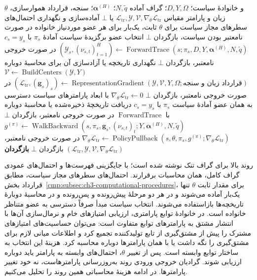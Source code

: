\begin{algorithm}[!htbp]
\caption{روند $\operatorname{FullBatchGradient}$: محاسبهٔ گرادیان تمام‌دسته‌ای}
\label{cmp:alg:ch3-gradient-full-batch}
\begin{algorithmic}[1]
\REQUIRE $\theta$ و خانوادهٔ سیاست؛ $D,Y,\Omega$؛
گراف آماده $N,\widetilde q$؛ $\boldsymbol\alpha^{(H)}$؛
سنجه، قرارداد هموارسازی، زیان و پارامتر مقیاس
\ENSURE $\mathcal L_{\mathrm{tr}},\mathscr Y,\mathcal V,
\nabla_\theta\mathcal L_{\mathrm{tr}}$ یا $\bot$
\STATE آماده‌سازی و نگهداری احتمال‌های سطرهای مجاز سیاست
برای $\theta$ ثابت، یک‌بار برای هر عضو موردنیاز خانواده
\STATE در صورت نامعتبر بودن سیاست، بازگردان $\bot$
    \STATE انتخاب عضو برگزیدهٔ سیاست آمادهٔ $\pi_s$ با $c_s=y_s$
    \STATE $(\mathscr Y_s,(\nu_{s,t})_{t=1}^{H})\gets
    \operatorname{ForwardTrace}(s;\pi_s,D,Y,\boldsymbol\alpha^{(H)},N,\widetilde q)$
    \STATE در صورت خروجی نامعتبر، بازگردان $\bot$
    \STATE نگهداری تاریخچه یا آزادسازی آن برای محاسبهٔ دوباره
\ENDFOR
\STATE $\mathcal V\gets\operatorname{BuildCenters}(\mathscr Y,Y)$
\STATE $(\mathcal L_{\mathrm{tr}},(\mathbf g_s)_s)\gets
\operatorname{RepresentationGradient}(\mathscr Y,\mathcal V,Y,\Omega;\text{قرارداد زیان و سنجه})$
\STATE در صورت خروجی نامعتبر، بازگردان $\bot$
\STATE $\nabla_\theta\mathcal L_{\mathrm{tr}}\gets0$ با ابعاد پارامترهای سیاست
    \STATE دسترسی به همان عضو آمادهٔ سیاست $\pi_s$ با $c_s=y_s$
    \STATE دریافت تاریخچهٔ ذخیره‌شده یا محاسبهٔ دوباره با $\operatorname{ForwardTrace}$
    \STATE در صورت خروجی نامعتبر، بازگردان $\bot$
    \STATE $g^{(\pi)}\gets
    \operatorname{WalkBackward}(s,\pi_s,\mathbf g_s,(\nu_{s,t})_t;
    Y,\boldsymbol\alpha^{(H)},N,\widetilde q)$
    \STATE $\nabla_\theta\mathcal L_{\mathrm{tr}}\gets
    \operatorname{PolicyPullback}(s,\theta,\pi_s,g^{(\pi)};
    \nabla_\theta\mathcal L_{\mathrm{tr}})$
    \STATE در صورت خروجی نامعتبر، بازگردان $\bot$
\ENDFOR
\STATE \textbf{بازگردان} $(\mathcal L_{\mathrm{tr}},\mathscr Y,\mathcal V,
\nabla_\theta\mathcal L_{\mathrm{tr}})$
\end{algorithmic}
\end{algorithm}

روند بالا برای گراف تنک نوشته شده است؛
با جایگزینی فهرست‌ها و احتمال‌های عمودی
گراف کامل، همان محاسبات برقرارند.
احتمال‌های سطرهای مجاز سیاست، مطابق قرارداد
بخش~\ref{cmp:subsec:ch3-computational-procedures}،
برای مقدار ثابت $\theta$ تنها یک‌بار آماده
می‌شوند و در هر دو مرحلهٔ پیش‌رونده و
پس‌رونده و در محاسبهٔ دوبارهٔ تاریخچه‌ها
بازاستفاده می‌شوند. انتخاب سیاست مبدأ صرفاً
دسترسی به عضو متناظر خانواده است. در خانوادهٔ
توابع پارامتری، ارزیابی امتیازهای خام و
نرمال‌سازی آن‌ها با انتشار مشتق به پارامترهای
توابع متفاوت است: می‌توان حساسیت‌های امتیازهای
مشترک را پیش از مشتق‌گیری از تابع تولیدکننده
تجمیع کرد و اطلاعات میانی لازم برای مشتق‌گیری
را نگه داشت یا با همان پارامترها دوباره محاسبه
کرد. هزینهٔ این انتخاب به ساختار توابع وابسته است.
پس از تغییر $\theta$، احتمال‌های وابسته به
پارامتر باید دوباره ارزیابی شوند.
گرادیان خروجی ورودی روند به‌روزرسانی
پارامترهاست، نه خود تغییر پارامترها.
در ادامه هزینهٔ محاسباتی همین روند را تحلیل می‌کنیم.

